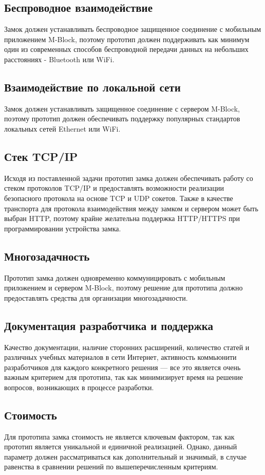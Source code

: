 \documentclass[twoside,a4paper]{msmb} %
\begin{document}
\subsection{Беспроводное взаимодействие}
Замок должен устанавливать беспроводное защищенное соединение с мобильным приложением M-Block, поэтому прототип должен поддерживать как минимум один из современных способов беспроводной передачи данных на небольших расстояниях - Bluetooth или WiFi.

\subsection{Взаимодействие по локальной сети}
Замок должен устанавливать защищенное соединение с сервером M-Block, поэтому прототип должен обеспечивать поддержку популярных стандартов локальных сетей Ethernet или WiFi.

\subsection{Стек TCP/IP}
Исходя из поставленной задачи прототип замка должен обеспечивать работу со стеком протоколов TCP/IP и предоставлять возможности реализации безопасного протокола на основе TCP и UDP сокетов. Также в качестве транспорта для протокола взаимодействия между замком и сервером может быть выбран HTTP, поэтому крайне желательна поддержка HTTP/HTTPS при программировании устройства замка.

\subsection{Многозадачность}
Прототип замка должен одновременно коммуницировать с мобильным приложением и сервером M-Block, поэтому решение для прототипа должно предоставлять средства для организации многозадачности.

\subsection{Документация разработчика и поддержка}
Качество документации, наличие сторонних расширений, количество статей и различных учебных материалов в сети Интернет, активность коммьюнити разработчиков для каждого конкретного решения --- все это является очень важным критерием для прототипа, так как минимизирует время на решение вопросов, возникающих в процессе разработки.

\subsection{Стоимость}
Для прототипа замка стоимость не является ключевым фактором, так как прототип является уникальной и единичной реализацией. Однако, данный параметр должен рассматриваться как дополнительный и значимый, в случае равенства в сравнении решений по вышеперечисленным критериям.
\end{document}
